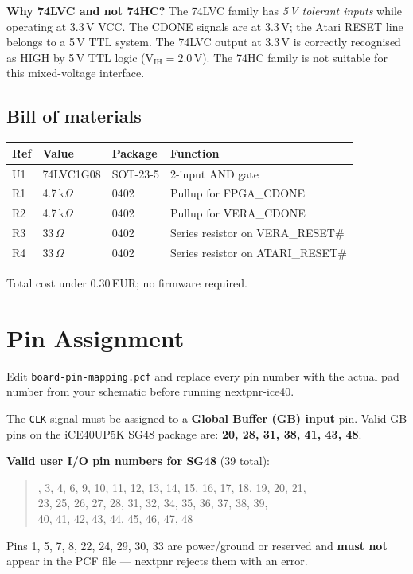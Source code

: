 \documentclass[11pt,a4paper]{article}
\newcommand{\sig}[1]{\texttt{#1}}
\newcommand{\file}[1]{\texttt{#1}}
\begin{document}
\textbf{Why 74LVC and not 74HC?}  The 74LVC family has \emph{5\,V
tolerant inputs} while operating at 3.3\,V VCC\@.  The CDONE signals
are at 3.3\,V; the Atari RESET line belongs to a 5\,V TTL system.  The
74LVC output at 3.3\,V is correctly recognised as HIGH by 5\,V TTL
logic (V$_{\text{IH}} = 2.0$\,V).  The 74HC family is not suitable for
this mixed-voltage interface.

\subsection{Bill of materials}

\begin{center}
\begin{tabular}{lllp{4.5cm}}
\toprule
\textbf{Ref} & \textbf{Value} & \textbf{Package} & \textbf{Function} \\
\midrule
U1  & 74LVC1G08      & SOT-23-5 & 2-input AND gate \\
R1  & 4.7\,k$\Omega$ & 0402     & Pullup for FPGA\_CDONE \\
R2  & 4.7\,k$\Omega$ & 0402     & Pullup for VERA\_CDONE \\
R3  & 33\,$\Omega$   & 0402     & Series resistor on VERA\_RESET\# \\
R4  & 33\,$\Omega$   & 0402     & Series resistor on ATARI\_RESET\# \\
\bottomrule
\end{tabular}
\end{center}

Total cost under 0.30\,EUR; no firmware required.

\section{Pin Assignment}
\label{sec:pins}

Edit \file{board-pin-mapping.pcf} and replace every pin number with the
actual pad number from your schematic before running nextpnr-ice40.

The \sig{CLK} signal must be assigned to a \textbf{Global Buffer (GB)
input} pin.  Valid GB pins on the iCE40UP5K SG48 package are:
\textbf{20, 28, 31, 38, 41, 43, 48}.

\textbf{Valid user I/O pin numbers for SG48} (39 total):
\begin{quote}, 3, 4, 6, 9, 10, 11, 12, 13, 14, 15, 16, 17, 18, 19, 20, 21,\\
23, 25, 26, 27, 28, 31, 32, 34, 35, 36, 37, 38, 39,\\
40, 41, 42, 43, 44, 45, 46, 47, 48
\end{quote}
Pins 1, 5, 7, 8, 22, 24, 29, 30, 33 are power/ground or reserved and
\textbf{must not} appear in the PCF file --- nextpnr rejects them with an
error.
\end{document}
